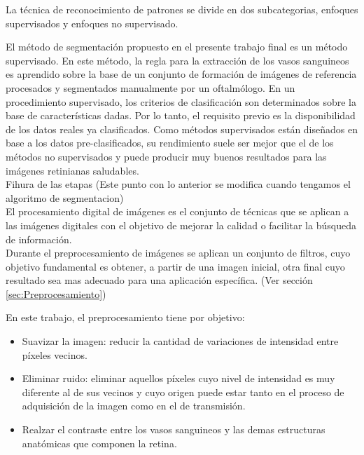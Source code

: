 La t\'ecnica de reconocimiento de patrones se divide en dos subcategorias, enfoques supervisados y enfoques no supervisado.

El m\'etodo de segmentaci\'on propuesto en el presente trabajo final es un m\'etodo supervisado. En este m\'etodo, la regla para la extracci\'on de los vasos sanguineos es aprendido sobre la base de un conjunto de formaci\'on de im\'agenes de referencia procesados y segmentados manualmente por un oftalm\'ologo. En un procedimiento supervisado, los criterios de clasificaci\'on son determinados sobre la base de caracter\'isticas dadas. Por lo tanto, el requisito previo es la disponibilidad de los datos reales ya clasificados. Como m\'etodos supervisados est\'an dise\~nados en base a los datos pre-clasificados, su rendimiento suele ser mejor que el de los m\'etodos no supervisados y puede producir muy buenos resultados para las im\'agenes retinianas saludables. \cite{fraz2012blood} \cite{akita1982computer} \cite{hoover2000locating} \\

Fihura de las etapas (Este punto con lo anterior se modifica cuando tengamos el algoritmo de segmentacion)\\

El procesamiento digital de im\'agenes es el conjunto de t\'ecnicas que se aplican a las im\'agenes digitales con el objetivo de mejorar la calidad o facilitar la b\'usqueda de informaci\'on.\\

Durante el preprocesamiento de im\'agenes se aplican un conjunto de filtros, cuyo objetivo fundamental es obtener, a partir de una imagen inicial, otra final cuyo resultado sea mas adecuado para una aplicaci\'on espec\'ifica. (Ver secci\'on \ref{sec:Preprocesamiento})

En este trabajo, el preprocesamiento tiene por objetivo:
\begin{itemize}
 \item Suavizar la imagen: reducir la cantidad de variaciones de intensidad entre p\'ixeles vecinos.
 \item Eliminar ruido: eliminar aquellos p\'ixeles cuyo nivel de intensidad es muy diferente al de sus vecinos y cuyo origen puede estar tanto en el proceso de adquisici\'on de la imagen como en el de transmisi\'on.
 \item Realzar el contraste entre los vasos sanguineos y las demas estructuras anat\'omicas que componen la retina.
\end{itemize}








